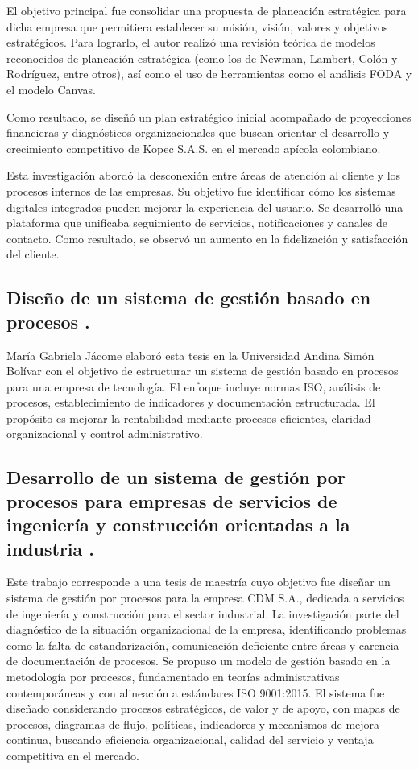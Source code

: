 El objetivo principal fue consolidar una propuesta de planeación estratégica para dicha empresa que permitiera establecer su misión, visión, valores y objetivos estratégicos. Para lograrlo, el autor realizó una revisión teórica de modelos reconocidos de planeación estratégica (como los de Newman, Lambert, Colón y Rodríguez, entre otros), así como el uso de herramientas como el análisis FODA y el modelo Canvas.

Como resultado, se diseñó un plan estratégico inicial acompañado de proyecciones financieras y diagnósticos organizacionales que buscan orientar el desarrollo y crecimiento competitivo de Kopec S.A.S. en el mercado apícola colombiano.

Esta investigación abordó la desconexión entre áreas de atención al cliente y los procesos internos de las empresas. Su objetivo fue identificar cómo los sistemas digitales integrados pueden mejorar la experiencia del usuario. Se desarrolló una plataforma que unificaba seguimiento de servicios, notificaciones y canales de contacto. Como resultado, se observó un aumento en la fidelización y satisfacción del cliente.

\subsection{Diseño de un sistema de gestión basado en procesos \cite{Jacome2016}.}

María Gabriela Jácome elaboró esta tesis en la Universidad Andina Simón Bolívar con el objetivo de estructurar un sistema de gestión basado en procesos para una empresa de tecnología. El enfoque incluye normas ISO, análisis de procesos, establecimiento de indicadores y documentación estructurada. El propósito es mejorar la rentabilidad mediante procesos eficientes, claridad organizacional y control administrativo.

\subsection{Desarrollo de un sistema de gestión por procesos para empresas de servicios de ingeniería y construcción orientadas a la industria \cite{Munoz2018}.}

Este trabajo corresponde a una tesis de maestría cuyo objetivo fue diseñar un sistema de gestión por procesos para la empresa CDM S.A., dedicada a servicios de ingeniería y construcción para el sector industrial. La investigación parte del diagnóstico de la situación organizacional de la empresa, identificando problemas como la falta de estandarización, comunicación deficiente entre áreas y carencia de documentación de procesos. Se propuso un modelo de gestión basado en la metodología por procesos, fundamentado en teorías administrativas contemporáneas y con alineación a estándares ISO 9001:2015. El sistema fue diseñado considerando procesos estratégicos, de valor y de apoyo, con mapas de procesos, diagramas de flujo, políticas, indicadores y mecanismos de mejora continua, buscando eficiencia organizacional, calidad del servicio y ventaja competitiva en el mercado.


